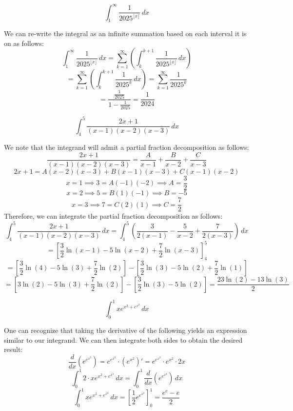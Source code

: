 \begin{questions}
    \question \[ \int_{1}^{\infty} \frac{1}{2025^{\lfloor x \rfloor}} \,dx \]
    \begin{solution}
        We can re-write the integral as an infinite summation based on each interval it is on as follows:
        \[ \int_{1}^{\infty} \frac{1}{2025^{\lfloor x \rfloor}} \,dx = \sum_{k=1}^{\infty} \left( \int_{k}^{k+1} \frac{1}{2025^{\lfloor x \rfloor}} \,dx \right) \]
        \[ = \sum_{k=1}^{\infty} \left( \int_{k}^{k+1} \frac{1}{2025^k} \,dx \right) = \sum_{k=1}^{\infty} \frac{1}{2025^k} \]
        \[ = \frac{\frac{1}{2025}}{1 - \frac{1}{2025}} = \frac{1}{2024} \]
    \end{solution}

    \question \[ \int_{4}^{5} \frac{2x + 1}{(x-1)(x-2)(x-3)} \,dx \]
    \begin{solution}
        We note that the integrand will admit a partial fraction decomposition as follows:
        \[ \frac{2x + 1}{(x-1)(x-2)(x-3)} = \frac{A}{x-1} + \frac{B}{x-2} + \frac{C}{x-3} \]
        \[ 2x + 1 = A(x-2)(x-3) + B(x-1)(x-3) + C(x-1)(x-2) \]
        \[ x = 1 \implies 3 = A(-1)(-2) \implies A = \frac{3}{2} \]
        \[ x = 2 \implies 5 = B(1)(-1) \implies B = -5 \]
        \[ x = 3 \implies 7 = C(2)(1) \implies C = \frac{7}{2} \]
        Therefore, we can integrate the partial fraction decomposition as follows:
        \[ \int_{4}^{5} \frac{2x + 1}{(x-1)(x-2)(x-3)} \,dx = \int_{4}^{5} \left( \frac{3}{2(x-1)} - \frac{5}{x-2} + \frac{7}{2(x-3)} \right) \,dx \]
        \[ = \left[ \frac{3}{2}\ln(x-1) - 5\ln(x-2) + \frac{7}{2}\ln(x-3) \right]_{4}^{5} \]
        \[ = \left[ \frac{3}{2}\ln(4) - 5\ln(3) + \frac{7}{2}\ln(2) \right] - \left[ \frac{3}{2}\ln(3) - 5\ln(2) + \frac{7}{2}\ln(1) \right] \]
        \[ = \left[ 3\ln(2) - 5\ln(3) + \frac{7}{2}\ln(2) \right] - \left[ \frac{3}{2}\ln(3) - 5\ln(2) \right] = \frac{23\ln(2) - 13\ln(3)}{2} \]
    \end{solution}

    \question \[ \int_{0}^{1} x e^{x^2 + e^{x^2}} \,dx \]
    \begin{solution}
        One can recognize that taking the derivative of the following yields an expression similar to our integrand. We can then integrate both sides to obtain the desired result:
        \[ \frac{d}{dx}\left( e^{e^{x^2}} \right) = e^{e^{x^2}} \cdot \left(e^{x^2}\right)' = e^{e^{x^2}} \cdot e^{x^2} \cdot 2x \]
        \[ \int_{0}^{1} 2 \cdot x e^{x^2 + e^{x^2}} \,dx = \int_{0}^{1} \frac{d}{dx}\left(e^{e^{x^2}}\right) \,dx \]
        \[ \int_{0}^{1} x e^{x^2 + e^{x^2}} \,dx = \left[ \frac{1}{2} e^{e^{x^2}} \right]_{0}^{1} = \frac{e^e - e}{2} \]
    \end{solution}


\end{questions}
